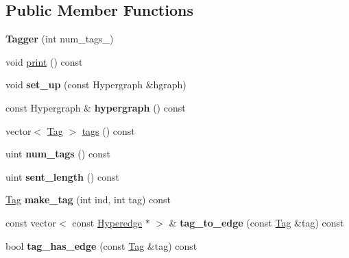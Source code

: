 \subsection*{Public Member Functions}
\begin{DoxyCompactItemize}
\item 
\hypertarget{class_tagger_a6e812fd7e339a21155f7b30f04292be1}{
{\bfseries Tagger} (int num\_\-tags\_\-)}
\label{class_tagger_a6e812fd7e339a21155f7b30f04292be1}

\item 
void \hyperlink{class_tagger_a4ebe0aebd7c0392970b401a5a6c6cd72}{print} () const 
\item 
\hypertarget{class_tagger_afafa6e435d17467db344ca615f24746f}{
void {\bfseries set\_\-up} (const Hypergraph \&hgraph)}
\label{class_tagger_afafa6e435d17467db344ca615f24746f}

\item 
\hypertarget{class_tagger_ad694ed218149b86c4ef5253328a41c49}{
const Hypergraph \& {\bfseries hypergraph} () const }
\label{class_tagger_ad694ed218149b86c4ef5253328a41c49}

\item 
vector$<$ \hyperlink{struct_tag}{Tag} $>$ \hyperlink{class_tagger_ae1e3802fb545c3430ca4d52ea5fd95db}{tags} () const 
\item 
\hypertarget{class_tagger_a5da221998377bf36c84013ba0d471b36}{
uint {\bfseries num\_\-tags} () const }
\label{class_tagger_a5da221998377bf36c84013ba0d471b36}

\item 
\hypertarget{class_tagger_ae762dd21f446b9ec618b0b83204bdc2e}{
uint {\bfseries sent\_\-length} () const }
\label{class_tagger_ae762dd21f446b9ec618b0b83204bdc2e}

\item 
\hypertarget{class_tagger_af01daf511528271a118a281b8595e0df}{
\hyperlink{struct_tag}{Tag} {\bfseries make\_\-tag} (int ind, int tag) const }
\label{class_tagger_af01daf511528271a118a281b8595e0df}

\item 
\hypertarget{class_tagger_a26472c386e7f5eebcb05c9d1843c1975}{
const vector$<$ const \hyperlink{class_scarab_1_1_h_g_1_1_hyperedge}{Hyperedge} $\ast$ $>$ \& {\bfseries tag\_\-to\_\-edge} (const \hyperlink{struct_tag}{Tag} \&tag) const }
\label{class_tagger_a26472c386e7f5eebcb05c9d1843c1975}

\item 
\hypertarget{class_tagger_ae270a5be64b93945c180996aedcf6372}{
bool {\bfseries tag\_\-has\_\-edge} (const \hyperlink{struct_tag}{Tag} \&tag) const }
\label{class_tagger_ae270a5be64b93945c180996aedcf6372}


\end{DoxyCompactItemize}
